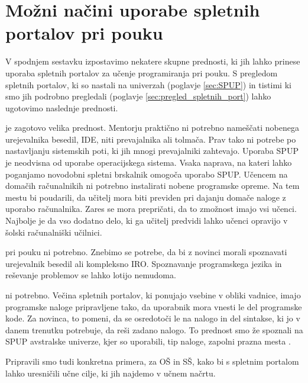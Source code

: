 \section{Možni načini uporabe spletnih portalov pri pouku}
\label{sec:načini_uporabe_sp}

V spodnjem sestavku izpostavimo nekatere skupne prednosti, ki jih
lahko prinese uporaba spletnih portalov za učenje programiranja pri
pouku. S pregledom spletnih portalov, ki so nastali na univerzah
(poglavje \ref{sec:SPUP}) in tistimi ki smo jih podrobno pregledali
(poglavje \ref{sec:pregled_spletnih_port}) lahko ugotovimo naslednje
prednosti.

\begin{description}
\tightlist
\item[Namestitev programske opreme ni potrebna] je zagotovo velika
  prednost. Mentorju praktično ni potrebno nameščati nobenega
  urejevalnika besedil, IDE, niti prevajalnika ali tolmača. Prav tako
  ni potrebe po nastavljanju sistemskih poti, ki jih mnogi
  prevajalniki zahtevajo. Uporaba SPUP je neodvisna od uporabe
  operacijskega sistema. Vsaka naprava, na kateri lahko poganjamo
  novodobni spletni brskalnik omogoča uporabo SPUP. Učencem na domačih
  računalnikih ni potrebno instalirati nobene programske opreme. Na
  tem mestu bi poudarili, da učitelj mora biti previden pri dajanju
  domače naloge z uporabo računalnika. Zares se mora prepričati, da to
  zmožnost imajo vsi učenci. Najbolje je da vso dodatno delo, ki ga
  učitelj predvidi lahko učenci opravijo v šolski računalniški
  učilnici.
\item[Seznanjanje s programsko opremo] pri pouku ni potrebno. Znebimo
  se potrebe, da bi z novinci morali spoznavati urejevalnik besedil
  ali kompleksno IRO. Spoznavanje programskega jezika in reševanje
  problemov se lahko lotijo nemudoma.
\item[Pisanje progama od začetka do konca] ni potrebno. Večina
  spletnih portalov, ki ponujajo vsebine v obliki vadnice, imajo
  programske naloge pripravljene tako, da uporabnik mora vnesti le del
  programske kode. Za novinca, to pomeni, da se osredotoči le na
  nalogo in del sintakse, ki jo v danem trenutku potrebuje, da reši
  zadano nalogo. To prednost smo že spoznali na SPUP avstralske
  univerze, kjer so uporabili, tip naloge, zapolni prazna mesta
  \cite{thesisAWebP}.
\item
\end{description}

Pripravili smo tudi konkretna primera, za OŠ in SŠ, kako bi s spletnim
portalom lahko uresničili učne cilje, ki jih najdemo v učnem načrtu.

